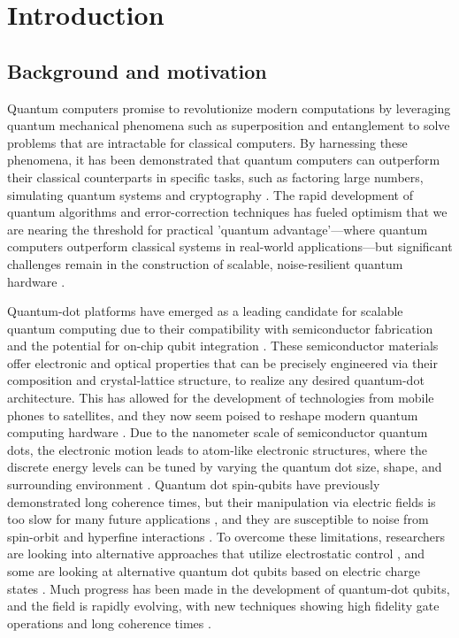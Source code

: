 \documentclass{subfiles}
\begin{document}
\chapter{Introduction}
\section{Background and motivation}
Quantum computers promise to revolutionize modern computations by leveraging quantum mechanical phenomena such as superposition and entanglement to solve problems that are intractable for classical computers. By harnessing these phenomena, it has been demonstrated that quantum computers can outperform their classical counterparts in specific tasks, such as factoring large numbers, simulating quantum systems and cryptography \cite{shor1999polynomial, shor1996fault, gisin2002quantum, grover1996fast}. The rapid development of quantum algorithms and error-correction techniques has fueled optimism that we are nearing the threshold for practical 'quantum advantage'—where quantum computers outperform classical systems in real-world applications—but significant challenges remain in the construction of scalable, noise-resilient quantum hardware  \cite{daley2022practical, lau2022nisq,}.

Quantum-dot platforms have emerged as a leading candidate for scalable quantum computing due to their compatibility with semiconductor fabrication and the potential for on-chip qubit integration \cite{burkard1999coupled, loss1998quantum}. These semiconductor materials offer electronic and optical properties that can be precisely engineered via their composition and crystal-lattice structure, to realize any desired quantum-dot architecture. This has allowed for the development of technologies from mobile phones to satellites, and they now seem poised to reshape modern quantum computing hardware \cite{garcia2021semiconductor, zhang2018qubits}. Due to the nanometer scale of semiconductor quantum dots, the electronic motion leads to atom-like electronic structures, where the discrete energy levels can be tuned by varying the quantum dot size, shape, and surrounding environment \cite{terna2021future}. Quantum dot spin-qubits have previously demonstrated long coherence times, but their manipulation via electric fields is too slow for many future applications \cite{stano2022review}, and they are susceptible to noise from spin-orbit and hyperfine interactions \cite{kuhlmann2013charge, yoneda2018quantum}. To overcome these limitations, researchers are looking into alternative approaches that utilize electrostatic control \cite{veldhorst2014addressable, weber2012engineering}, and some are looking at alternative quantum dot qubits based on electric charge states \cite{gorman2005charge, kim2015microwave}. Much progress has been made in the development of quantum-dot qubits, and the field is rapidly evolving, with new techniques showing high fidelity gate operations and long coherence times \cite{garcia2021semiconductor}.
\end{document}
